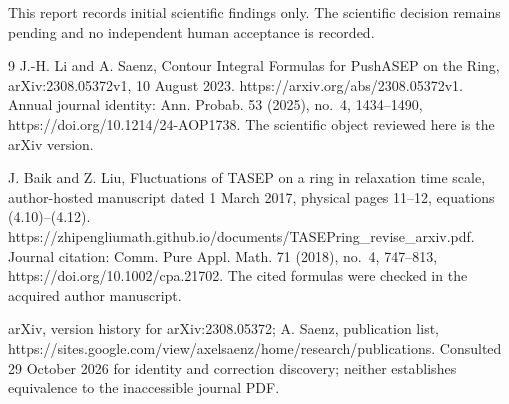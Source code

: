 \documentclass[10pt]{article}
\begin{document}
This report records initial scientific findings only. The scientific decision remains pending and no independent human acceptance is recorded.\par
9 J.-H. Li and A. Saenz, Contour Integral Formulas for PushASEP on the Ring, arXiv:2308.05372v1, 10 August 2023. https://arxiv.org/abs/2308.05372v1. Annual journal identity: Ann. Probab. 53 (2025), no. 4, 1434–1490, https://doi.org/10.1214/24-AOP1738. The scientific object reviewed here is the arXiv version.\par
J. Baik and Z. Liu, Fluctuations of TASEP on a ring in relaxation time scale, author-hosted manuscript dated 1 March 2017, physical pages 11–12, equations (4.10)–(4.12). https://zhipengliumath.github.io/documents/TASEPring\_revise\_arxiv.pdf. Journal citation: Comm. Pure Appl. Math. 71 (2018), no. 4, 747–813, https://doi.org/10.1002/cpa.21702. The cited formulas were checked in the acquired author manuscript.\par
arXiv, version history for arXiv:2308.05372; A. Saenz, publication list, https://sites.google.com/view/axelsaenz/home/research/publications. Consulted 29 October 2026 for identity and correction discovery; neither establishes equivalence to the inaccessible journal PDF.\par
\end{document}
